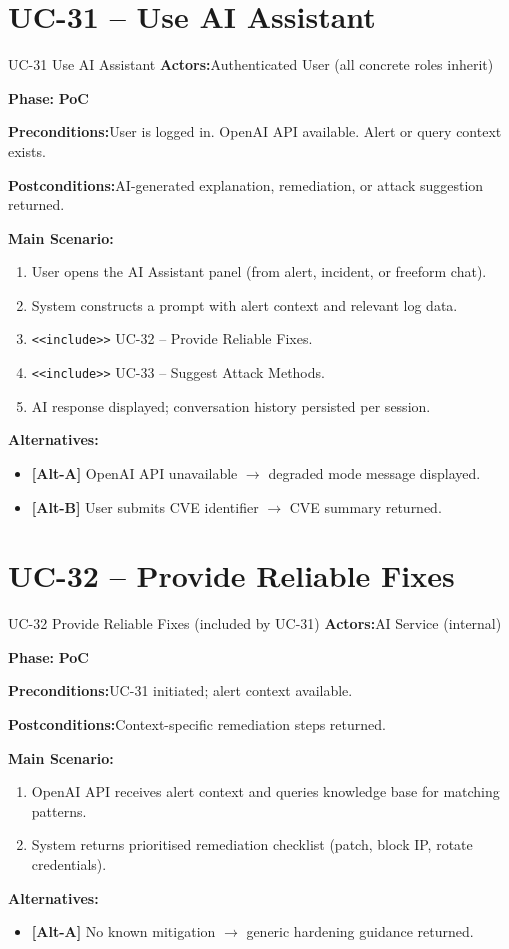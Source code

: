 \documentclass[12pt,a4paper]{report}
\newcommand{\ucfield}[2]{%
    \noindent\textbf{\color{helixpurplemid}#1:}\quad #2\par\medskip
}
\newcommand{\ucphase}[1]{%
    \noindent\textbf{\color{helixpurplemid}Phase:}\quad%
    \ifstrequal{#1}{PoC}{\textcolor{helixteal}{\textbf{PoC}}}{\textcolor{helixamber}{\textbf{Future MVP}}}%
    \par\medskip
}
\begin{document}
\section{UC-31 -- Use AI Assistant}
\begin{ucbox}{UC-31 \quad Use AI Assistant}
    \ucfield{Actors}{Authenticated User (all concrete roles inherit)}
    \ucphase{PoC}
    \ucfield{Preconditions}{User is logged in. OpenAI API available. Alert or query context exists.}
    \ucfield{Postconditions}{AI-generated explanation, remediation, or attack suggestion returned.}
    \textbf{\color{helixpurplemid}Main Scenario:}
    \begin{enumerate}
        \item User opens the AI Assistant panel (from alert, incident, or freeform chat).
        \item System constructs a prompt with alert context and relevant log data.
        \item \texttt{<<include>>} UC-32 -- Provide Reliable Fixes.
        \item \texttt{<<include>>} UC-33 -- Suggest Attack Methods.
        \item AI response displayed; conversation history persisted per session.
    \end{enumerate}
    \textbf{\color{helixpurplemid}Alternatives:}
    \begin{itemize}
        \item \textbf{[Alt-A]} OpenAI API unavailable $\rightarrow$ degraded mode message displayed.
        \item \textbf{[Alt-B]} User submits CVE identifier $\rightarrow$ CVE summary returned.
    \end{itemize}
\end{ucbox}

\section{UC-32 -- Provide Reliable Fixes}
\begin{ucbox}{UC-32 \quad Provide Reliable Fixes \textnormal{(included by UC-31)}}
    \ucfield{Actors}{AI Service (internal)}
    \ucphase{PoC}
    \ucfield{Preconditions}{UC-31 initiated; alert context available.}
    \ucfield{Postconditions}{Context-specific remediation steps returned.}
    \textbf{\color{helixpurplemid}Main Scenario:}
    \begin{enumerate}
        \item OpenAI API receives alert context and queries knowledge base for matching patterns.
        \item System returns prioritised remediation checklist (patch, block IP, rotate credentials).
    \end{enumerate}
    \textbf{\color{helixpurplemid}Alternatives:}
    \begin{itemize}
        \item \textbf{[Alt-A]} No known mitigation $\rightarrow$ generic hardening guidance returned.
    \end{itemize}
\end{ucbox}
\end{document}

